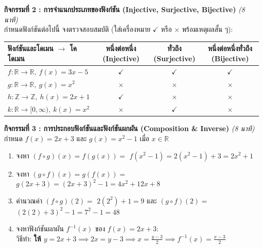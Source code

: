 \documentclass[a4paper,12pt]{article}
\newcommand{\ans}[1]{\textbf{\color{ans}#1}}
\begin{document}
\noindent\textbf{กิจกรรมที่ 2 : การจำแนกประเภทของฟังก์ชัน (Injective, Surjective, Bijective)} \hfill \textit{(8 นาที)}\\
กำหนดฟังก์ชันต่อไปนี้ จงตรวจสอบสมบัติ (ใส่เครื่องหมาย $\checkmark$ หรือ $\times$ พร้อมเหตุผลสั้น ๆ):
\begin{center}
\small
\begin{tabular}{|l|c|c|c|}
\hline
\textbf{ฟังก์ชันและโดเมน $\to$ โคโดเมน} & \textbf{หนึ่งต่อหนึ่ง (Injective)} & \textbf{ทั่วถึง (Surjective)} & \textbf{หนึ่งต่อหนึ่งทั่วถึง (Bijective)} \\ \hline
$f: \mathbb{R} \to \mathbb{R}, \ f(x) = 3x - 5$ & \ans{$\checkmark$} & \ans{$\checkmark$} & \ans{$\checkmark$} \\ \hline
$g: \mathbb{R} \to \mathbb{R}, \ g(x) = x^2$ & \ans{$\times$} & \ans{$\times$} & \ans{$\times$} \\ \hline
$h: \mathbb{Z} \to \mathbb{Z}, \ h(x) = 2x + 1$ & \ans{$\checkmark$} & \ans{$\times$} & \ans{$\times$} \\ \hline
$k: \mathbb{R} \to [0, \infty), \ k(x) = x^2$ & \ans{$\times$} & \ans{$\checkmark$} & \ans{$\times$} \\ \hline
\end{tabular}
\end{center}
\vspace{0.2em}

\noindent\textbf{กิจกรรมที่ 3 : การประกอบฟังก์ชันและฟังก์ชันผกผัน (Composition \& Inverse)} \hfill \textit{(8 นาที)}\\
กำหนด $f(x) = 2x + 3$ และ $g(x) = x^2 - 1$ เมื่อ $x \in \mathbb{R}$
\begin{enumerate}[label=\arabic*)]
  \item จงหา $(f \circ g)(x) = f(g(x)) = $ \ans{$f(x^2 - 1) = 2(x^2 - 1) + 3 = 2x^2 + 1$}
  \item จงหา $(g \circ f)(x) = g(f(x)) = $ \ans{$g(2x + 3) = (2x + 3)^2 - 1 = 4x^2 + 12x + 8$}
  \item คำนวณค่า $(f \circ g)(2) =$ \ans{$2(2^2) + 1 = 9$} \quad และ $(g \circ f)(2) =$ \ans{$(2(2)+3)^2 - 1 = 7^2 - 1 = 48$}
  \item จงหาฟังก์ชันผกผัน $f^{-1}(x)$ ของ $f(x) = 2x + 3$:\\[0.15em]
        วิธีทำ: \ans{ให้ $y = 2x + 3 \implies 2x = y - 3 \implies x = \frac{y - 3}{2} \implies f^{-1}(x) = \frac{x - 3}{2}$}
\end{enumerate}
\vspace{0.2em}
\end{document}
